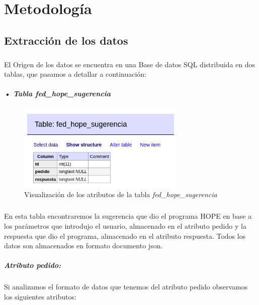 \documentclass[10pt,a4paper,oneside]{book}
\begin{document}
\chapter{Metodología}

\section{Extracción de los datos}

\paragraph{}
El Origen de los datos se encuentra en una Base de datos SQL distribuida en dos tablas, que pasamos a detallar a continuación:

\paragraph{• Tabla \textit{fed\_hope\_sugerencia}}

\paragraph{}
\begin{figure}[!htb]
  \centering
  \includegraphics[width=8cm]{images/metodologia_tabla_fed_hope_sugerencia.png}
  \caption{Visualización de los atributos de la tabla \textit{fed\_hope\_sugerencia}}
\end{figure}

\paragraph{}
En esta tabla encontraremos la sugerencia que dio el programa HOPE en base a los parámetros que introdujo el usuario, almacenado en el atributo pedido y la respuesta que dio el programa, almacenado en el atributo respuesta. Todos los datos son almacenados en formato documento json.

\newpage
\paragraph{\textbf{Atributo pedido}: } Si analizamos el formato de datos que tenemos del atributo pedido observamos los siguientes atributos:
\end{document}
